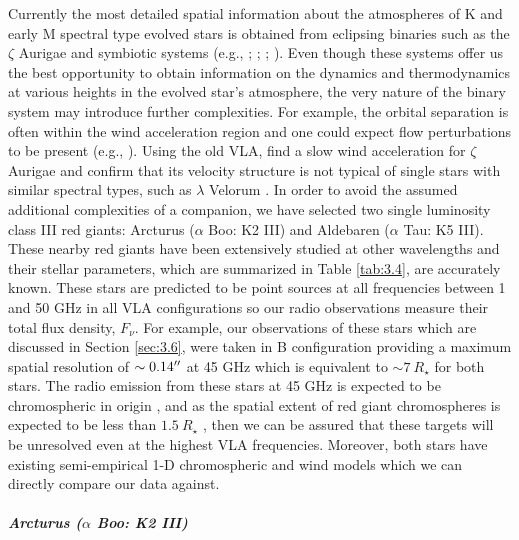 Currently the most detailed spatial information about the atmospheres of K and early M spectral type evolved stars is obtained from eclipsing binaries such as the $\zeta$ Aurigae and symbiotic systems (e.g., \citealt{wright_1970}; \citealt{baade_1996}; \citealt{eaton_2008}; \citealt{crowley_2008}). Even though these systems offer us the best opportunity to obtain information on the dynamics and thermodynamics at various heights in the evolved star's atmosphere, the very nature of the binary system may introduce further complexities. For example, the orbital separation is often within the wind acceleration region and one could expect flow perturbations to be present (e.g., \citealt{chapman_1981}). 
Using the old VLA, \cite{harper_2005} find a slow wind acceleration for $\zeta$ Aurigae and confirm that its velocity structure is not typical of single stars with similar spectral types, such as $\lambda$ Velorum \citep{carpenter_1999}.   In order to avoid the assumed additional complexities of a companion, we have selected two single luminosity class III red giants: Arcturus ($\alpha$ Boo: K2 III) and Aldebaren ($\alpha$ Tau: K5 III). These nearby red giants have been extensively studied at other wavelengths and their stellar parameters, which are summarized in Table \ref{tab:3.4}, are accurately known. These stars are predicted to be point sources at all frequencies between 1 and 50 GHz in all VLA configurations so our radio observations measure their total flux density, $F_{\nu}$. For example, our observations of these stars which are discussed in Section \ref{sec:3.6}, were taken in B configuration providing a maximum spatial resolution of $\sim 0.14 ^{\prime\prime}$ at 45 GHz which is equivalent to $\sim 7\ R_{\star}$ for both stars. The radio emission from these stars at 45 GHz is expected to be chromospheric in origin \citep{harper_2013}, and as the spatial extent of red giant chromospheres is expected to be less than $1.5 \ R_{\star}$ \citep{berio_2011}, then we can be assured that these targets will be unresolved even at the highest VLA frequencies. Moreover, both stars have existing semi-empirical 1-D chromospheric and wind models which we can directly compare our data against.
\\
\\
\textbf{\textit{Arcturus ($\alpha$ Boo: K2 III)}}\\
